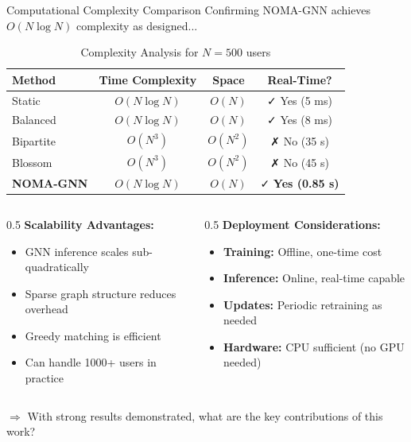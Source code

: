 \documentclass[aspectratio=169]{beamer}
\begin{document}
\begin{frame}{Computational Complexity Comparison}
    \vspace{-0.2cm}
    \small \textcolor{iiitblue}{Confirming NOMA-GNN achieves $O(N \log N)$ complexity as designed...}
    
    \begin{table}
        \centering
        \begin{tabular}{lccc}
            \toprule
            \textbf{Method} & \textbf{Time Complexity} & \textbf{Space} & \textbf{Real-Time?} \\
            \midrule
            Static & $O(N \log N)$ & $O(N)$ & ✓ Yes (5 ms) \\
            Balanced & $O(N \log N)$ & $O(N)$ & ✓ Yes (8 ms) \\
            Bipartite & $O(N^3)$ & $O(N^2)$ & ✗ No (35 s) \\
            Blossom & $O(N^3)$ & $O(N^2)$ & ✗ No (45 s) \\
            \midrule
            \rowcolor{nomagreen!20}
            \textbf{NOMA-GNN} & $O(N \log N)$ & $O(N)$ & ✓ \textbf{Yes (0.85 s)} \\
            \bottomrule
        \end{tabular}
        \caption{Complexity Analysis for $N=500$ users}
    \end{table}
\vspace{-.2cm}
    \begin{columns}
        \begin{column}{0.5\textwidth}
            \textbf{Scalability Advantages:}
            \begin{itemize}
                \item GNN inference scales sub-quadratically
                \item Sparse graph structure reduces overhead
                \item Greedy matching is efficient
                \item Can handle 1000+ users in practice
            \end{itemize}
        \end{column}
        \begin{column}{0.5\textwidth}
            \textbf{Deployment Considerations:}
            \begin{itemize}
                \item \textbf{Training:} Offline, one-time cost
                \item \textbf{Inference:} Online, real-time capable
                \item \textbf{Updates:} Periodic retraining as needed
                \item \textbf{Hardware:} CPU sufficient (no GPU needed)
            \end{itemize}
        \end{column}
    \end{columns}
    
    \vspace{0.2cm}
    \small \textcolor{iiitblue}{$\Rightarrow$ With strong results demonstrated, what are the key contributions of this work?}
\end{frame}
\end{document}
